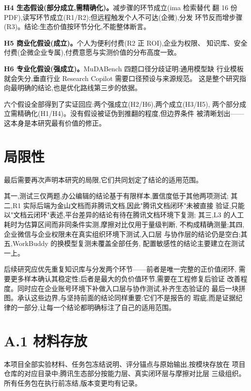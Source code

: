 \documentclass[
  12pt,
  a4paper,
  oneside,
  headings=normal,
  numbers=noendperiod,
  listof=totoc,
  bibliography=totoc
]{scrreprt}
\newif\ifIncludeAppendix
\begin{document}
\textbf{H4 生态假设(部分成立,需精确化)。}减步骤的环节成立(ima 检索替代
翻 16 份 PDF),读写环节成立(R1/R2);但远程触发个人不可达(企微),分发
环节反而增步骤(R3)。结论:生态价值按环节分化,不能整体断言。

\textbf{H5 商业化假设(成立)。}个人为便利付费(R2 正 ROI),企业为权限、
知识库、安全付费(企微企业专属),付费意愿与实测价值的分布高度一致。

\textbf{H6 专业化假设(强成立)。}MuDABench 四题口径分歧证明:通用模型缺
行业模板就会失分,垂直行业 Research Copilot 需要口径预设与来源规范。
这是整个研究指向最明确的结论,也是优化路线第三步的依据。

六个假设全部得到了实证回应:两个强成立(H2/H6),两个成立(H3/H5),
两个部分成立需精确化(H1/H4)。没有假设被证伪到推翻的程度,但边界条件
被清晰划出——这本身是本研究最有价值的修正。

\section{局限性}

最后需要再次声明本研究的局限,它们共同划定了结论的适用范围。

其一,测试三仅两题,办公编辑的结论基于有限样本,置信度低于其他两项测试;
其二,R1 实际后端为金山文档而非腾讯文档,因此"腾讯文档闭环"未被直接
验证,只能以"文档云闭环"表述,平台差异的结论有待在腾讯文档环境下复测;
其三,L3 的人工耗时为估算区间而非同条件实测,摩擦对比仅用于量级判断,
不构成精确测量;其四,企业微信与企业权限未在真实组织环境下测试,入口层
与协作层的结论仍是空白;其五,WorkBuddy 的换模型复测未覆盖全部任务,
配置敏感性的结论主要建立在测试一上。

后续研究应优先重复知识库与分发两个环节——前者是唯一完整的正价值闭环,
需要更多样本确认其稳定性;后者是最大的负价值环节,需要在工程修复后验证
改善程度。同时应在企业账号环境下补做入口层与协作测试,补齐生态验证的
最后一块拼图。承认这些边界,与坚持前面的结论同样重要:它们不是报告的
瑕疵,而是证据纪律的一部分,让每一个结论都明确标注了自己的适用范围。

\renewcommand{\bibname}{参考文献}



\ifIncludeAppendix

  \section*{A.1 材料存放}
  本项目全部实验材料、任务包冻结说明、评分锚点与原始输出,按模块存放在
  项目仓库的对应目录中;腾讯生态部分按能力层、真实闭环层与摩擦对比层
  三级组织。所有任务包在执行前冻结,版本变更均有记录。
\end{document}
